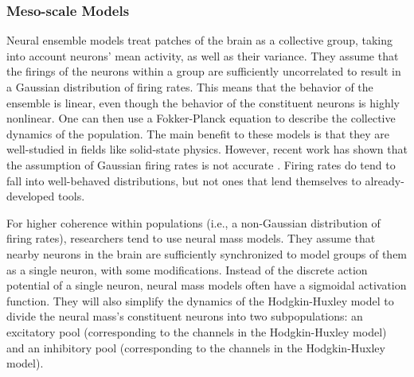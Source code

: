 \subsubsection{Meso-scale Models}
\label{sec:intro_seizures_neuroanatomy_meso_scale}
Neural ensemble models treat patches of the brain as a collective group, taking into account neurons' mean activity, as well as their variance.
They assume that the firings of the neurons within a group are sufficiently uncorrelated to result in a Gaussian distribution of firing rates.
This means that the behavior of the ensemble is linear, even though the behavior of the constituent neurons is highly nonlinear.
One can then use a Fokker-Planck equation to describe the collective dynamics of the population.
The main benefit to these models is that they are well-studied in fields like solid-state physics.
However, recent work has shown that the assumption of Gaussian firing rates is not accurate \cite{Breakspear2017}.
Firing rates do tend to fall into well-behaved distributions, but not ones that lend themselves to already-developed tools.

For higher coherence within populations (i.e., a non-Gaussian distribution of firing rates), researchers tend to use neural mass models.
They assume that nearby neurons in the brain are sufficiently synchronized to model groups of them as a single neuron, with some modifications.
Instead of the discrete action potential of a single neuron, neural mass models often have a sigmoidal activation function.
They will also simplify the dynamics of the Hodgkin-Huxley model to divide the neural mass's constituent neurons into two subpopulations: an excitatory pool (corresponding to the  channels in the Hodgkin-Huxley model) and an inhibitory pool (corresponding to the  channels in the Hodgkin-Huxley model).

